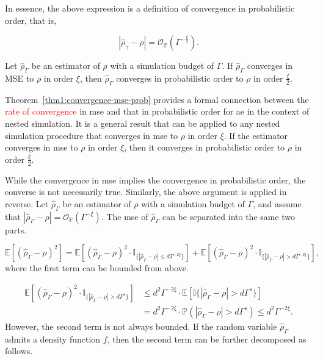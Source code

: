 In essence, the above expression is a definition of convergence in probabilistic order, that is,

$$
    \left| \hat{\rho}_{\gamma} - \rho \right| = \mathcal{O}_\mathbb{P} \left( \Gamma^{-\frac{\xi}{2}} \right).
$$

\begin{theorem}\label{thm1:convergence-mse-prob}
    Let $\hat{\rho}_{\Gamma}$ be an estimator of $\rho$ with a simulation budget of $\Gamma$. 
    If $\hat{\rho}_{\Gamma}$ converges in MSE to $\rho$ in order $\xi$, then $\hat{\rho}_{\Gamma}$ converges in probabilistic order to $\rho$ in order $\frac{\xi}{2}$.
\end{theorem}

Theorem~\ref{thm1:convergence-mse-prob} provides a formal connection between the \textcolor{red}{rate of convergence} in \gls{mse} and that in probabilistic order for \gls{ae} in the context of nested simulation.
It is a general result that can be applied to any nested simulation procedure that converges in \gls{mse} to $\rho$ in order $\xi$.
If the estimator converges in \gls{mse} to $\rho$ in order $\xi$, then it converges in probabilistic order to $\rho$ in order $\frac{\xi}{2}$.

While the convergence in \gls{mse} implies the convergence in probabilistic order, the converse is not necessarily true.
Similarly, the above argument is applied in reverse.
Let $\hat{\rho}_{\Gamma}$ be an estimator of $\rho$ with a simulation budget of $\Gamma$, and assume that $|\hat{\rho}_{\Gamma} - \rho| = \mathcal{O}_{\mathbb{P}}(\Gamma^{-\xi})$.
The \gls{mse} of $\hat{\rho}_{\Gamma}$ can be separated into the same two parts.

$$
    \mathbb{E}\left[ \left(\hat{\rho}_{\Gamma} - \rho\right)^2 \right] = \mathbb{E} \left[ \left(\hat{\rho}_{\Gamma} - \rho\right)^2 \cdot \mathbb{I}_{\{|\hat{\rho}_{\Gamma} - \rho| \leq d\Gamma^{-2\xi}\}} \right] + \mathbb{E} \left[ \left(\hat{\rho}_{\Gamma} - \rho\right)^2 \cdot \mathbb{I}_{\{|\hat{\rho}_{\Gamma} - \rho| > d\Gamma^{-2\xi}\}} \right], 
$$
where the first term can be bounded from above.

\begin{align*}
    \mathbb{E} \left[ \left(\hat{\rho}_{\Gamma} - \rho\right)^2 \cdot \mathbb{I}_{\{|\hat{\rho}_{\Gamma} - \rho| > d\Gamma^s\}} \right] 
    & \leq d^2 \Gamma^{-2\xi} \cdot \mathbb{E} \left[ \mathbb{I}\{|\hat{\rho}_{\Gamma} - \rho| > d\Gamma^s \} \right] \\
    & = d^2 \Gamma^{-2\xi} \cdot \mathbb{P} \left(|\hat{\rho}_{\Gamma} - \rho| > d\Gamma^s \right) \leq d^2 \Gamma^{-2\xi}.
\end{align*}
However, the second term is not always bounded. 
If the random variable $\hat{\rho}_{\Gamma}$ admits a density function $f$, then the second term can be further decomposed as follows.

